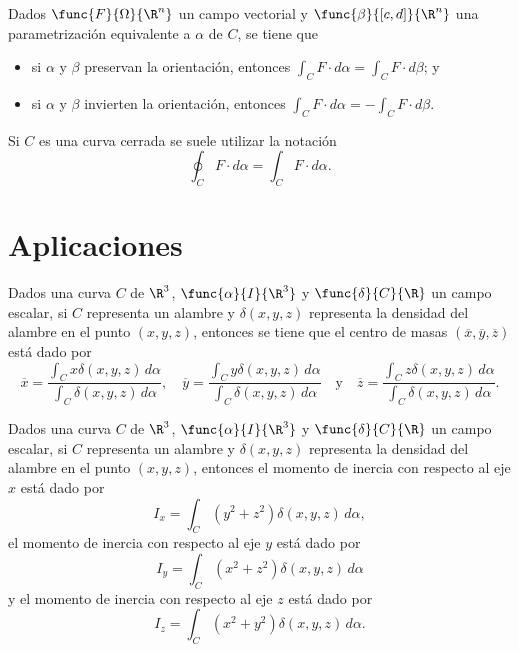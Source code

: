 \documentclass[a4,11pt]{aleph-notas}
\begin{document}
\begin{prop}
    Dados $\func{F}{\Omega}{\R^n}$ un campo vectorial y $\func{\beta}{[c,d]}{\R^n}$ una parametrización equivalente a $\alpha$ de $C$, se tiene que
    \begin{itemize}
        \item si $\alpha$ y $\beta$ preservan la orientación, entonces $\int_C F \cdot d\alpha = \int_C F \cdot d\beta$; y
        \item si $\alpha$ y $\beta$ invierten la orientación, entonces $\int_C F \cdot d\alpha = - \int_C F \cdot d\beta$.
    \end{itemize}
\end{prop}

\begin{advertencia}
    Si $C$ es una curva cerrada se suele utilizar la notación
    \[
        \oint_C F \cdot d\alpha = \int_C F \cdot d\alpha.
    \]
\end{advertencia}

\section{Aplicaciones}

\begin{advertencia}
    Dados una curva $C$ de $\R^3$, $\func{\alpha}{I}{\R^3}$ y $\func{\delta}{C}{\R}$ un campo escalar, si $C$ representa un alambre y $\delta(x,y,z)$ representa la densidad del alambre en el punto $(x,y,z)$, entonces se tiene que el centro de masas $(\overline{x},\overline{y},\overline{z})$ está dado por
    \[
        \overline{x}=
        \frac{\int_C x\delta(x,y,z)\, d\alpha}
        {\int_C \delta(x,y,z)\, d\alpha},
        \quad
        \overline{y}=
        \frac{\int_C y\delta(x,y,z)\, d\alpha}
        {\int_C \delta(x,y,z)\, d\alpha}
        \quad\text{y}\quad
        \overline{z}=
        \frac{\int_C z\delta(x,y,z)\, d\alpha}
        {\int_C \delta(x,y,z)\, d\alpha}.
    \]
\end{advertencia}

\begin{advertencia}
    Dados una curva $C$ de $\R^3$, $\func{\alpha}{I}{\R^3}$ y $\func{\delta}{C}{\R}$ un campo escalar, si $C$ representa un alambre y $\delta(x,y,z)$ representa la densidad del alambre en el punto $(x,y,z)$, entonces el momento de inercia con respecto al eje $x$ está dado por
    \[
        I_x =
        \int_C (y^2+z^2)\delta(x,y,z)\, d\alpha,
    \]
    el momento de inercia con respecto al eje $y$ está dado por
    \[
        I_y =
        \int_C (x^2+z^2)\delta(x,y,z)\, d\alpha
    \]
    y el momento de inercia con respecto al eje $z$ está dado por
    \[
        I_z =
        \int_C (x^2+y^2)\delta(x,y,z)\, d\alpha.
    \]
\end{advertencia}
\end{document}
